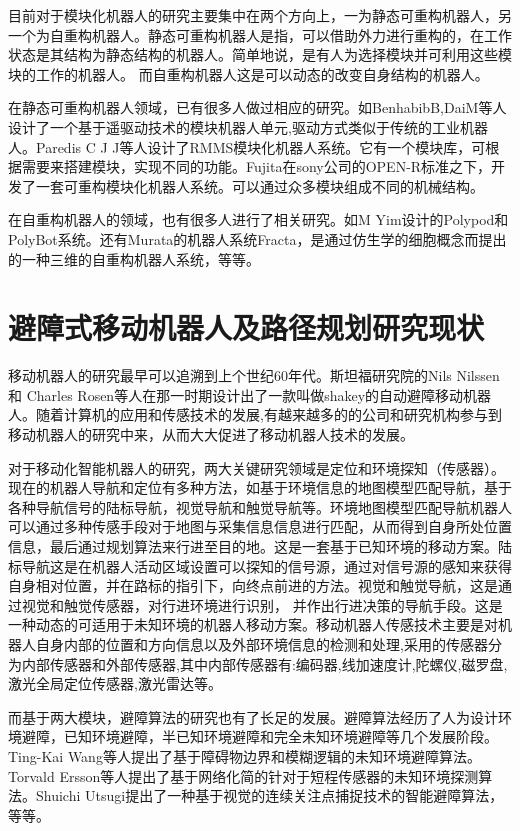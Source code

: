 目前对于模块化机器人的研究主要集中在两个方向上，一为静态可重构机器人，另一个为自重构机器人。静态可重构机器人是指，可以借助外力进行重构的，在工作状态是其结构为静态结构的机器人。简单地说，是有人为选择模块并可利用这些模块的工作的机器人。 而自重构机器人这是可以动态的改变自身结构的机器人。

在静态可重构机器人领域，已有很多人做过相应的研究。如BenhabibB,DaiM等人设计了一个基于遥驱动技术的模块机器人单元,驱动方式类似于传统的工业机器人。Paredis C J J等人设计了RMMS模块化机器人系统。它有一个模块库，可根据需要来搭建模块，实现不同的功能。Fujita在sony公司的OPEN-R标准之下，开发了一套可重构模块化机器人系统。可以通过众多模块组成不同的机械结构。 

在自重构机器人的领域，也有很多人进行了相关研究。如M Yim设计的Polypod和PolyBot系统。还有Murata的机器人系统Fracta，是通过仿生学的细胞概念而提出的一种三维的自重构机器人系统，等等。

\section{避障式移动机器人及路径规划研究现状}
移动机器人的研究最早可以追溯到上个世纪60年代。斯坦福研究院的Nils Nilssen和 Charles Rosen等人在那一时期设计出了一款叫做shakey的自动避障移动机器人。随着计算机的应用和传感技术的发展,有越来越多的的公司和研究机构参与到移动机器人的研究中来，从而大大促进了移动机器人技术的发展。 

对于移动化智能机器人的研究，两大关键研究领域是定位和环境探知（传感器）。现在的机器人导航和定位有多种方法，如基于环境信息的地图模型匹配导航，基于各种导航信号的陆标导航，视觉导航和触觉导航等。环境地图模型匹配导航机器人可以通过多种传感手段对于地图与采集信息信息进行匹配，从而得到自身所处位置信息，最后通过规划算法来行进至目的地。这是一套基于已知环境的移动方案。陆标导航这是在机器人活动区域设置可以探知的信号源，通过对信号源的感知来获得自身相对位置，并在路标的指引下，向终点前进的方法。视觉和触觉导航，这是通过视觉和触觉传感器，对行进环境进行识别， 并作出行进决策的导航手段。这是一种动态的可适用于未知环境的机器人移动方案。移动机器人传感技术主要是对机器人自身内部的位置和方向信息以及外部环境信息的检测和处理,采用的传感器分为内部传感器和外部传感器,其中内部传感器有:编码器,线加速度计,陀螺仪,磁罗盘,激光全局定位传感器,激光雷达等。 

而基于两大模块，避障算法的研究也有了长足的发展。避障算法经历了人为设计环境避障，已知环境避障，半已知环境避障和完全未知环境避障等几个发展阶段。Ting-Kai Wang等人提出了基于障碍物边界和模糊逻辑的未知环境避障算法。Torvald Ersson等人提出了基于网络化简的针对于短程传感器的未知环境探测算法。Shuichi Utsugi提出了一种基于视觉的连续关注点捕捉技术的智能避障算法，等等。 

